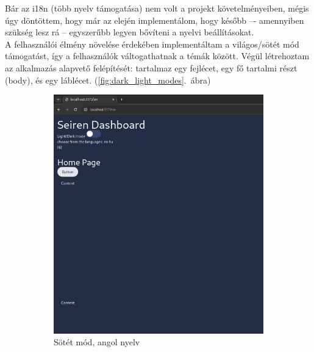 \documentclass[a4paper]{article}
\begin{document}
Bár az i18n (több nyelv támogatása) nem volt a projekt követelményeiben, mégis úgy döntöttem, hogy
már az elején implementálom, hogy később –- amennyiben szükség lesz rá -- egyszerűbb legyen bővíteni
a nyelvi beállításokat.\\

A felhasználói élmény növelése érdekében implementáltam a világos/sötét mód támogatást, így a
felhasználók váltogathatnak a témák között. Végül lét\-re\-hoz\-tam az alkalmazás alapvető felépítését:
tartalmaz egy fejlécet, egy fő tartalmi részt (body), és egy láblécet. (\ref{fig:dark_light_modes}.~ábra)\\

\begin{figure}[ht]
    \centering
    \begin{subfigure}[b]{0.45\textwidth}
        \centering
        \includegraphics[width=\textwidth]{images/dark_preview.png}
        \caption{Sötét mód, angol nyelv}
        \label{fig:dark_mode}
    \end{subfigure}
    \hfill
    \begin{subfigure}[b]{0.45\textwidth}
        \centering

\end{subfigure}
\end{figure}
\end{document}
